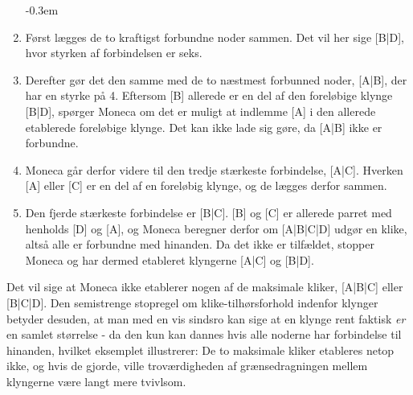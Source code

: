 \begin{enumerate} \label{metode_monecastepbystep}
\itemsep -0.3em
  \item Først lægges de to kraftigst forbundne noder sammen. Det vil her sige [B|D], hvor styrken af forbindelsen er seks.
  \item Derefter gør det den samme med de to næstmest forbunned noder, [A|B], der har en styrke på 4. Eftersom [B] allerede er en del af den foreløbige klynge [B|D], spørger Moneca om det er muligt at indlemme [A] i den allerede etablerede foreløbige klynge. Det kan ikke lade sig gøre, da [A|B] ikke er forbundne.
  \item Moneca går derfor videre til den tredje stærkeste forbindelse, [A|C]. Hverken [A] eller [C] er en del af en foreløbig klynge, og de lægges derfor sammen.
  \item Den fjerde stærkeste forbindelse er [B|C]. [B] og [C] er allerede parret med henholds [D] og [A], og Moneca beregner derfor om [A|B|C|D] udgør en klike, altså alle er forbundne med hinanden. Da det ikke er tilfældet, stopper Moneca og har dermed etableret klyngerne [A|C] og [B|D].
\end{enumerate}
Det vil sige at Moneca ikke etablerer nogen af de maksimale kliker, [A|B|C] eller [B|C|D]. Den semistrenge stopregel om klike-tilhørsforhold indenfor klynger betyder desuden, at man med en vis sindsro kan sige at en klynge rent faktisk \emph{er} en samlet størrelse - da den kun kan dannes hvis alle noderne har forbindelse til hinanden, hvilket eksemplet illustrerer: De to maksimale kliker etableres netop ikke, og hvis de gjorde, ville troværdigheden af grænsedragningen mellem klyngerne være langt mere tvivlsom.

